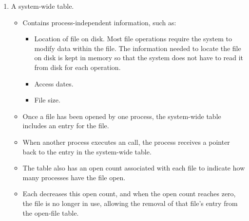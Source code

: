 \begin{enumerate}[noitemsep]
\item A system-wide table.
  \begin{itemize}[noitemsep]
  \item Contains process-independent information, such as:
    \begin{itemize}[noitemsep]
    \item Location of file on disk.
      Most file operations require the system to modify data within the file.
      The information needed to locate the file on disk is kept in memory so that the system does not have to read it from disk for each operation.
    \item Access dates.
    \item File size.
    \end{itemize}
  \item Once a file has been opened by one process, the system-wide table includes an entry for the file.
  \item When another process executes an  call, the process receives a pointer back to the entry in the system-wide table.
  \item The table also has an open count associated with each file to indicate how many processes have the file open.
  \item Each  decreases this open count, and when the open count reaches zero, the file is no longer in use, allowing the removal of that file’s entry from the open-file table.
  \end{itemize}
\end{enumerate}

